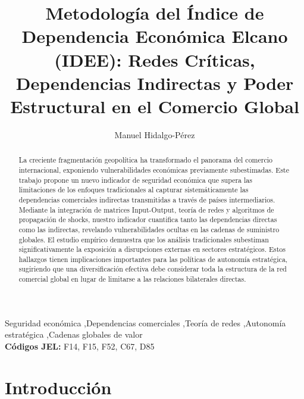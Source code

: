 \documentclass[final,1p,times,authoryear]{elsarticle}
\begin{document}
\begin{frontmatter}
\title{Metodología del Índice de Dependencia Económica Elcano (IDEE): Redes Críticas, Dependencias Indirectas y Poder Estructural en el Comercio Global}

\author[upo,elcano]{Manuel Hidalgo-Pérez}



\begin{abstract}
La creciente fragmentación geopolítica ha transformado el panorama del comercio internacional, exponiendo vulnerabilidades económicas previamente subestimadas. Este trabajo propone un nuevo indicador de seguridad económica que supera las limitaciones de los enfoques tradicionales al capturar sistemáticamente las dependencias comerciales indirectas transmitidas a través de países intermediarios. Mediante la integración de matrices Input-Output, teoría de redes y algoritmos de propagación de shocks, nuestro indicador cuantifica tanto las dependencias directas como las indirectas, revelando vulnerabilidades ocultas en las cadenas de suministro globales. El estudio empírico demuestra que los análisis tradicionales subestiman significativamente la exposición a disrupciones externas en sectores estratégicos. Estos hallazgos tienen implicaciones importantes para las políticas de autonomía estratégica, sugiriendo que una diversificación efectiva debe considerar toda la estructura de la red comercial global en lugar de limitarse a las relaciones bilaterales directas.
\end{abstract}

\begin{keyword}
Seguridad económica \sep Dependencias comerciales \sep Teoría de redes \sep Autonomía estratégica \sep Cadenas globales de valor\\
\textbf{Códigos JEL:} F14, F15, F52, C67, D85
\end{keyword}
\end{frontmatter}

\section{Introducción}
\end{document}
